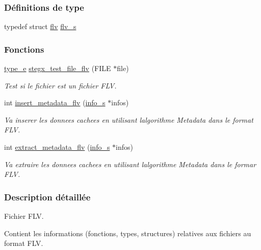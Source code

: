 \subsubsection*{Définitions de type}
\begin{DoxyCompactItemize}
\item 
typedef struct \hyperlink{a00166}{flv} \hyperlink{a00083_a3b9efa7321ea7018b7209626e444db19}{flv\+\_\+s}
\end{DoxyCompactItemize}
\subsubsection*{Fonctions}
\begin{DoxyCompactItemize}
\item 
\hyperlink{a00047_af1ca434cca36ba9fb2a45f6cef3a16d6}{type\+\_\+e} \hyperlink{a00083_aeb8aa72db41eb744e933e7fed2a920a7}{stegx\+\_\+test\+\_\+file\+\_\+flv} (F\+I\+LE $\ast$file)
\begin{DoxyCompactList}\small\item\em Test si le fichier est un fichier F\+LV. \end{DoxyCompactList}\item 
int \hyperlink{a00083_aca61ada38d1e29a78be8587538cabdf6}{insert\+\_\+metadata\+\_\+flv} (\hyperlink{a00008_aa8ca908d92fb5bdd3c0a9e1f58b2cf03}{info\+\_\+s} $\ast$infos)
\begin{DoxyCompactList}\small\item\em Va inserer les donnees cachees en utilisant l\textquotesingle{}algorithme Metadata dans le format F\+LV. \end{DoxyCompactList}\item 
int \hyperlink{a00083_ac1c7c5c1221f121e1c0014efe23b82f8}{extract\+\_\+metadata\+\_\+flv} (\hyperlink{a00008_aa8ca908d92fb5bdd3c0a9e1f58b2cf03}{info\+\_\+s} $\ast$infos)
\begin{DoxyCompactList}\small\item\em Va extraire les donnees cachees en utilisant l\textquotesingle{}algorithme Metadata dans le formar F\+LV. \end{DoxyCompactList}\end{DoxyCompactItemize}


\subsubsection{Description détaillée}
Fichier F\+LV. 

Contient les informations (fonctions, types, structures) relatives aux fichiers au format F\+LV. 

